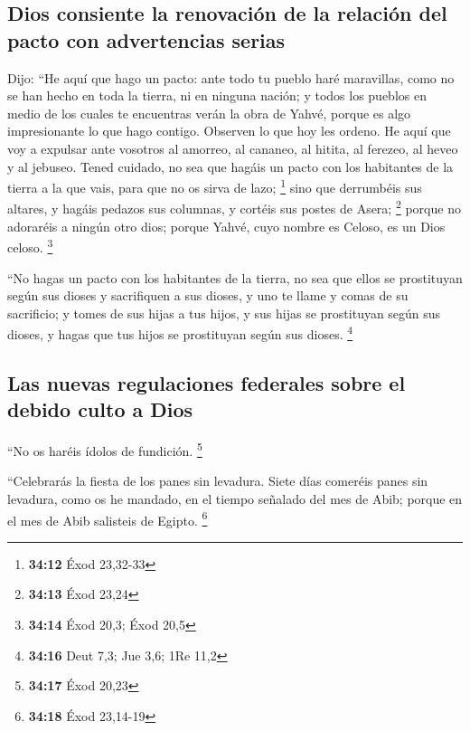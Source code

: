 \begin{paracol}{2}
{\subsection{Dios consiente la renovación de la relación del pacto con
advertencias
serias}\label{dios-consiente-la-renovaciuxf3n-de-la-relaciuxf3n-del-pacto-con-advertencias-serias}}

 Dijo: ``He aquí que hago un pacto: ante todo tu pueblo
haré maravillas, como no se han hecho en toda la tierra, ni en ninguna
nación; y todos los pueblos en medio de los cuales te encuentras verán
la obra de Yahvé, porque es algo impresionante lo que hago contigo.
 Observen lo que hoy les ordeno. He aquí que voy a
expulsar ante vosotros al amorreo, al cananeo, al hitita, al ferezeo, al
heveo y al jebuseo.  Tened cuidado, no sea que hagáis un
pacto con los habitantes de la tierra a la que vais, para que no os
sirva de lazo; \footnote{\textbf{34:12} Éxod 23,32-33} 
sino que derrumbéis sus altares, y hagáis pedazos sus columnas, y
cortéis sus postes de Asera; \footnote{\textbf{34:13} Éxod 23,24}
 porque no adoraréis a ningún otro dios; porque Yahvé,
cuyo nombre es Celoso, es un Dios celoso. \footnote{\textbf{34:14} Éxod
  20,3; Éxod 20,5}

 ``No hagas un pacto con los habitantes de la tierra, no
sea que ellos se prostituyan según sus dioses y sacrifiquen a sus
dioses, y uno te llame y comas de su sacrificio;  y tomes
de sus hijas a tus hijos, y sus hijas se prostituyan según sus dioses, y
hagas que tus hijos se prostituyan según sus dioses. \footnote{\textbf{34:16}
  Deut 7,3; Jue 3,6; 1Re 11,2}

\hypertarget{las-nuevas-regulaciones-federales-sobre-el-debido-culto-a-dios}{%
\subsection{Las nuevas regulaciones federales sobre el debido culto a
Dios}\label{las-nuevas-regulaciones-federales-sobre-el-debido-culto-a-dios}}

 ``No os haréis ídolos de fundición. \footnote{\textbf{34:17}
  Éxod 20,23}

 ``Celebrarás la fiesta de los panes sin levadura. Siete
días comeréis panes sin levadura, como os he mandado, en el tiempo
señalado del mes de Abib; porque en el mes de Abib salisteis de Egipto.
\footnote{\textbf{34:18} Éxod 23,14-19}


\end{paracol}
